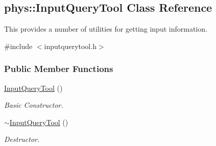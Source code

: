 \hypertarget{classphys_1_1InputQueryTool}{
\subsection{phys::InputQueryTool Class Reference}
\label{da/d96/classphys_1_1InputQueryTool}
}


This provides a number of utilities for getting input information.  




{\ttfamily \#include $<$inputquerytool.h$>$}

\subsubsection*{Public Member Functions}
\begin{DoxyCompactItemize}
\item 
\hyperlink{classphys_1_1InputQueryTool_a10a997ec2e072d31808c794542c0516f}{InputQueryTool} ()
\begin{DoxyCompactList}\small\item\em Basic Constructor. \item\end{DoxyCompactList}\item 
\hyperlink{classphys_1_1InputQueryTool_a6a37616800928b691932045ba34759b8}{$\sim$InputQueryTool} ()
\begin{DoxyCompactList}\small\item\em Destructor. \item\end{DoxyCompactList}\end{DoxyCompactItemize}
